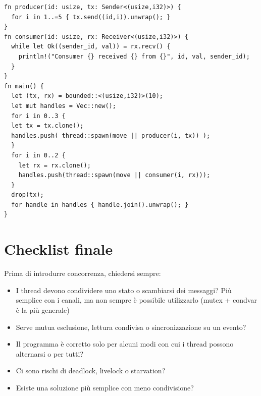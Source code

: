 \begin{verbatim}
fn producer(id: usize, tx: Sender<(usize,i32)>) {
  for i in 1..=5 { tx.send((id,i)).unwrap(); }
}
fn consumer(id: usize, rx: Receiver<(usize,i32)>) {
  while let Ok((sender_id, val)) = rx.recv() {
    println!("Consumer {} received {} from {}", id, val, sender_id);
  }
}
fn main() {
  let (tx, rx) = bounded::<(usize,i32)>(10);
  let mut handles = Vec::new();
  for i in 0..3 {
  let tx = tx.clone();
  handles.push( thread::spawn(move || producer(i, tx)) );
  }
  for i in 0..2 {
    let rx = rx.clone();
    handles.push(thread::spawn(move || consumer(i, rx)));
  }
  drop(tx);
  for handle in handles { handle.join().unwrap(); }
}
\end{verbatim}

\section{Checklist finale}

Prima di introdurre concorrenza, chiedersi sempre:

\begin{itemize}

  \item I thread devono condividere uno stato o scambiarsi dei messaggi? Più semplice con i canali, ma non sempre è possibile utilizzarlo (mutex + condvar è la più generale)
  \item Serve mutua esclusione, lettura condivisa o sincronizzazione su un evento?
  \item Il programma è corretto solo per alcuni modi con cui i thread possono alternarsi o per tutti?
  \item Ci sono rischi di deadlock, livelock o starvation?
  \item Esiste una soluzione più semplice con meno condivisione?

\end{itemize}
